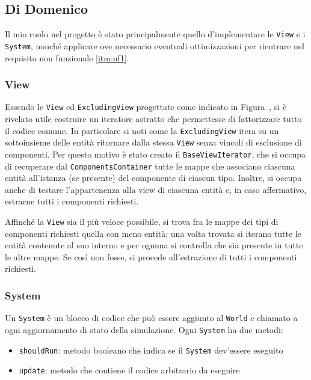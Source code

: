 \subsection{Di Domenico}\label{subsec:nicolò-di-domenico}

Il mio ruolo nel progetto è stato principalmente quello d'implementare le \texttt{View} e i \texttt{System}, nonché
applicare ove necessario eventuali ottimizzazioni per rientrare nel requisito non funzionale \ref{itm:nf1}.

\subsubsection{View}

Essendo le \texttt{View} ed \texttt{ExcludingView} progettate come indicato in Figura~, si è rivelato utile costruire un
iteratore astratto che permettesse di fattorizzare tutto il codice comune.
In particolare si noti come la \texttt{ExcludingView} itera su un sottoinsieme delle entità ritornare dalla stessa
\texttt{View} senza vincoli di esclusione di componenti.
Per questo motivo è stato creato il \texttt{BaseViewIterator}, che si occupa di recuperare dal
\texttt{ComponentsContainer} tutte le mappe che associano ciascuna entità all'istanza (se presente) del componente di
ciascun tipo.
Inoltre, si occupa anche di testare l'appartenenza alla view di ciascuna entità e, in caso affermativo, estrarne tutti i
componenti richiesti.

Affinché la \texttt{View} sia il più veloce possibile, si trova fra le mappe dei tipi di componenti richiesti quella con
meno entità;
una volta trovata si iterano tutte le entità contenute al suo interno e per ognuna si controlla che sia presente in
tutte le altre mappe.
Se così non fosse, si procede all'estrazione di tutti i componenti richiesti.

\subsubsection{System}

Un \texttt{System} è un blocco di codice che può essere aggiunto al \texttt{World} e chiamato a ogni aggiornamento di
stato della simulazione.
Ogni \texttt{System} ha due metodi:
\begin{itemize}
    \item \texttt{shouldRun}: metodo booleano che indica se il \texttt{System} dev'essere eseguito
    \item \texttt{update}: metodo che contiene il codice arbitrario da eseguire
\end{itemize}

